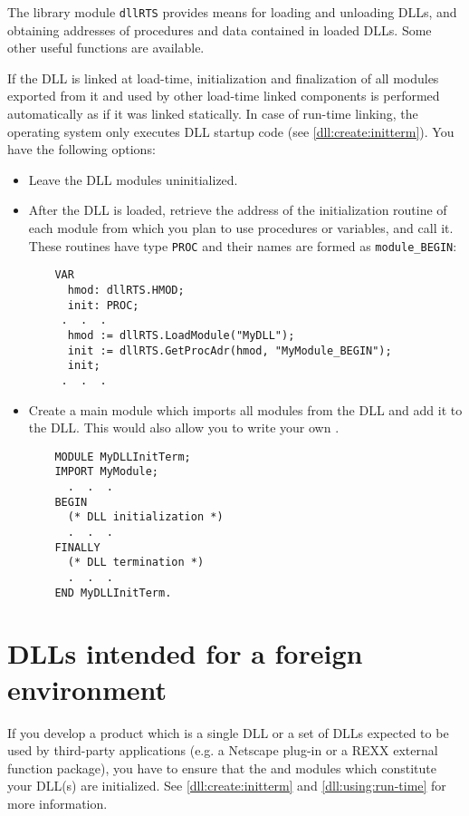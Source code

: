 The library module \verb'dllRTS' provides means for loading and
unloading DLLs, and obtaining addresses of procedures and data
contained in loaded DLLs. Some other useful functions are available.

If the DLL is linked at load-time, initialization and
finalization of all modules exported from it and used by other
load-time linked components is performed automatically as
if it was linked statically. In case of run-time linking,
the operating system only executes DLL startup code (see \ref{dll:create:initterm}).
You have the following options:

\begin{itemize}
\item Leave the DLL modules uninitialized.
\item After the DLL is loaded, retrieve the address of the initialization
      routine of each module from which you plan to use procedures
      or variables, and call it. These routines have type \verb'PROC' and their
      names are formed as \verb'module_BEGIN':

\begin{verbatim}
    VAR
      hmod: dllRTS.HMOD;
      init: PROC;
     .  .  .
      hmod := dllRTS.LoadModule("MyDLL");
      init := dllRTS.GetProcAdr(hmod, "MyModule_BEGIN");
      init;
     .  .  .
\end{verbatim}

\item Create a main module which imports all modules from the DLL and add it
      to the DLL. This would also allow you to write your own
      .
\begin{verbatim}
    MODULE MyDLLInitTerm;
    IMPORT MyModule;
      .  .  .
    BEGIN
      (* DLL initialization *)
      .  .  .
    FINALLY
      (* DLL termination *)
      .  .  .
    END MyDLLInitTerm.
\end{verbatim}
\end{itemize}

\section{DLLs intended for a foreign environment}
\label{dll:foreign}

If you develop a product which is a single DLL or a set of DLLs expected to be
used by third-party applications (e.g. a Netscape plug-in or a REXX external
function package), you have to ensure that the \mt{} and \ot{} modules which
constitute your DLL(s) are initialized. See \ref{dll:create:initterm} and
\ref{dll:using:run-time} for more information.

